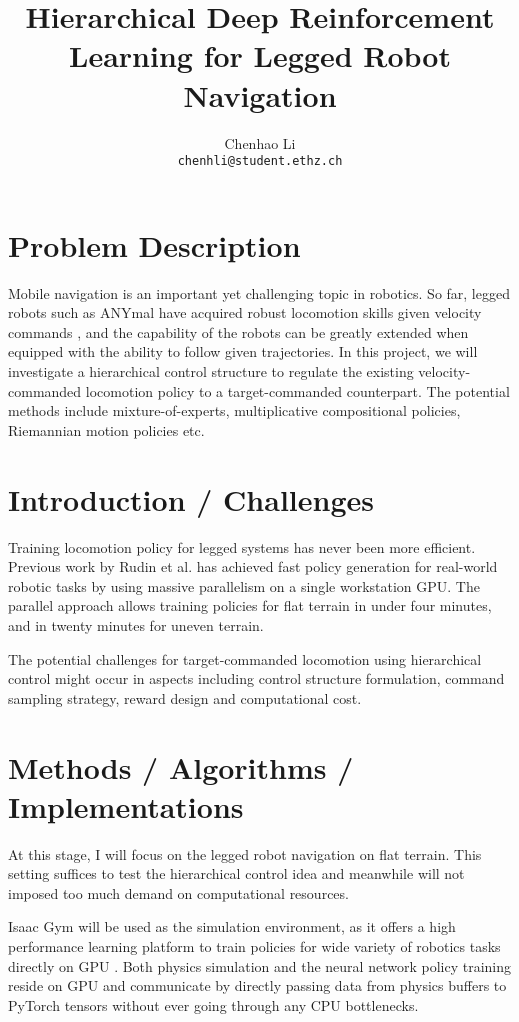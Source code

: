\documentclass{article}
\title{Hierarchical Deep Reinforcement Learning for Legged Robot Navigation}
\author{
    Chenhao Li \\
    \texttt{chenhli@student.ethz.ch} \\
}
\begin{document}
\maketitle

\section{Problem Description}
Mobile navigation is an important yet challenging topic in robotics. So far, legged robots such as ANYmal have acquired robust locomotion skills given velocity commands \cite{DBLP:journals/corr/abs-2010-11251}, and the capability of the robots can be greatly extended when equipped with the ability to follow given trajectories. In this project, we will investigate a hierarchical control structure to regulate the existing velocity-commanded locomotion policy to a target-commanded counterpart. The potential methods include mixture-of-experts, multiplicative compositional policies, Riemannian motion policies etc.


\section{Introduction / Challenges}
Training locomotion policy for legged systems has never been more efficient. Previous work by Rudin et al. \cite{rudin2021learning} has achieved fast policy generation for real-world robotic tasks by using massive parallelism on a single workstation GPU. The parallel approach allows training policies for flat terrain in under four minutes, and in twenty minutes for uneven terrain. 

The potential challenges for target-commanded locomotion using hierarchical control might occur in aspects including control structure formulation, command sampling strategy, reward design and computational cost.


\section{Methods / Algorithms / Implementations}
At this stage, I will focus on the legged robot navigation on flat terrain. This setting suffices to test the hierarchical control idea and meanwhile will not imposed too much demand on computational resources.

Isaac Gym will be used as the simulation environment, as it offers a high performance learning platform to train policies for wide variety of robotics tasks directly on GPU \cite{makoviychuk2021isaac}. Both physics simulation and the neural network policy training reside on GPU and communicate by directly passing data from physics buffers to PyTorch tensors without ever going through any CPU bottlenecks.
\end{document}
